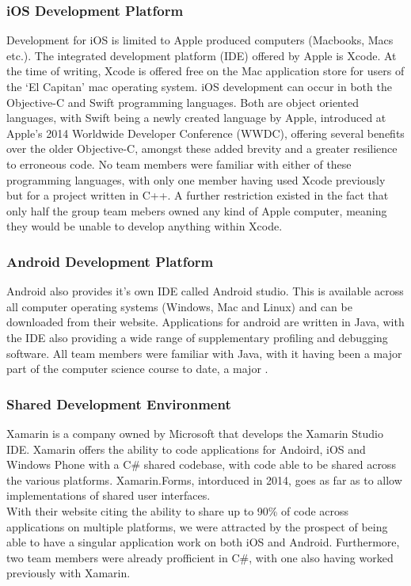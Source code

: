 \documentclass[main.tex]{subfiles}
\begin{document}
\subsubsection{iOS Development Platform}
Development for iOS is limited to Apple produced computers (Macbooks, Macs etc.). The integrated development platform (IDE) offered by Apple is Xcode. At the time of writing, Xcode is offered free on the Mac application store for users of the `El Capitan' mac operating system. iOS development can occur in both the Objective-C and Swift programming languages. Both are object oriented languages, with Swift being a newly created language by Apple, introduced at Apple's 2014 Worldwide Developer Conference (WWDC), offering several benefits over the older Objective-C, amongst these added brevity and a greater resilience to erroneous code. No team members were familiar with either of these programming languages, with only one member having used Xcode previously but for a project written in C++. A further restriction existed in the fact that only half the group team mebers owned any kind of Apple computer, meaning they would be unable to develop anything within Xcode.

\subsubsection{Android Development Platform}

Android also provides it's own IDE called Android studio. This is available across all computer operating systems (Windows, Mac and Linux) and can be downloaded from their website. Applications for android are written in Java, with the IDE also providing a wide range of supplementary profiling and debugging software. All team members were familiar with Java, with it having been a major part of the computer science course to date, a major .

\subsubsection{Shared Development Environment}

Xamarin is a company owned by Microsoft that develops the Xamarin Studio IDE. Xamarin offers the ability to code applications for Andoird, iOS and Windows Phone with a C\# shared codebase, with code able to be shared across the various platforms. Xamarin.Forms, intorduced in 2014, goes as far as to allow implementations of shared user interfaces.\\
With their website citing the ability to share up to 90\% of code across applications on multiple platforms, we were attracted by the prospect of being able to have a singular application work on both iOS and Android. Furthermore, two team members were already profficient in C\#, with one also having worked previously with Xamarin.
 

 
\end{document}
